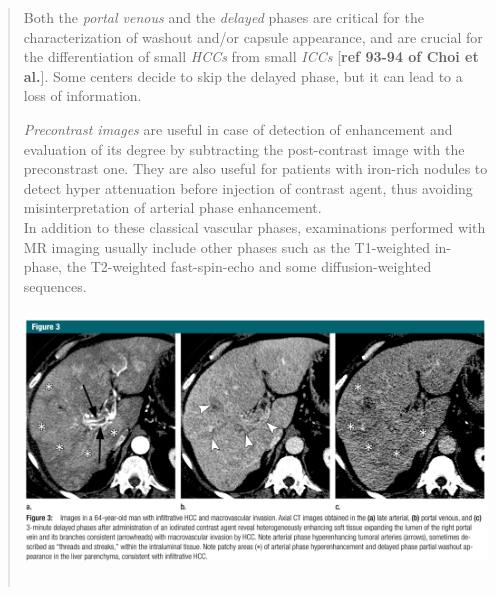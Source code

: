 \documentclass[]{article}
\begin{document}
\begin{quote}
Both the \emph{portal venous} and the \emph{delayed} phases are critical
for the characterization of washout and/or capsule appearance, and are
crucial for the differentiation of small \emph{HCCs} from small
\emph{ICCs} {[}\textbf{ref 93-94 of Choi et al.}{]}. Some centers decide
to skip the delayed phase, but it can lead to a loss of information.

\emph{Precontrast images} are useful in case of detection of enhancement
and evaluation of its degree by subtracting the post-contrast image with
the preconstrast one. They are also useful for patients with iron-rich
nodules to detect hyper attenuation before injection of contrast agent,
thus avoiding misinterpretation of arterial phase enhancement.\\
In addition to these classical vascular phases, examinations performed
with MR imaging usually include other phases such as the T1-weighted
in-phase, the T2-weighted fast-spin-echo and some diffusion-weighted
sequences.\\
\includegraphics[width=5.67251in,height=2.97760in]{./images/media/image13.png}
\end{quote}
\end{document}
